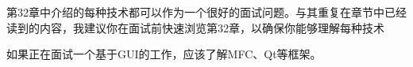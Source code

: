 第32章中介绍的每种技术都可以作为一个很好的面试问题。与其重复在章节中已经读到的内容，我建议你在面试前快速浏览第32章，以确保你能够理解每种技术

如果正在面试一个基于GUI的工作，应该了解MFC、Qt等框架。